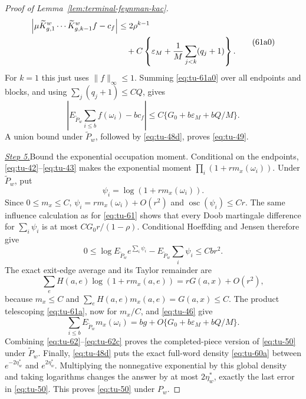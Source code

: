 \begin{proof}[Proof of Lemma~\ref{lem:terminal-feynman-kac}]
\begin{equation}
\begin{split}
\left|\mu\widetilde K_{g,1}^w\cdots
 \widetilde K_{g,k-1}^wf-c_f\right|
 &\le2\rho^{k-1}\\
 &\quad+C\left\{\varepsilon_M+
 {1\over M}\sum_{j<k}(q_j+1)\right\}.                      \end{split}
\tag{61a0}\label{eq:tu-61a0}
\end{equation}
For \(k=1\) this just uses \(\|f\|_\infty\le1\).
Summing \eqref{eq:tu-61a0} over all endpoints and blocks, and using
\(\sum_j(q_j+1)\le C Q\), gives
\begin{equation}
 \left|E_{\widetilde P_w}\sum_{i\le b}f(\omega_i)-bc_f\right|
 \le C\{G_0+b\varepsilon_M+bQ/M\}.                         \tag{61a}\label{eq:tu-61a}
\end{equation}
A union bound under \(\widetilde P_w\), followed by \eqref{eq:tu-48d}, proves
\eqref{eq:tu-49}.

\smallskip\noindent
\underline{\textit{Step 5.}}\quad Bound the exponential occupation moment.
Conditional on the endpoints, \eqref{eq:tu-42}--\eqref{eq:tu-43} makes the exponential moment
\(\prod_i(1+rm_x(\omega_i))\).  Under \(\widetilde P_w\), put
\begin{equation}
                 \psi_i=\log(1+rm_x(\omega_i)).              \tag{62}\label{eq:tu-62}
\end{equation}
Since \(0\le m_x\le C\),
\(\psi_i=rm_x(\omega_i)+O(r^2)\) and
\(\operatorname {osc}(\psi_i)\le Cr\).  The same influence calculation
as for \eqref{eq:tu-61} shows that every Doob martingale difference for
\(\sum_i\psi_i\) is at most \(CG_0r/(1-\rho)\).  Conditional Hoeffding and
Jensen therefore give
\begin{equation}
 0\le\log E_{\widetilde P_w}e^{\sum_i\psi_i}
       -E_{\widetilde P_w}\sum_i\psi_i\le Cbr^2.             \tag{62a}\label{eq:tu-62a}
\end{equation}
The exact exit-edge average and its Taylor remainder are
\begin{equation}
 \sum_eH(a,e)\log(1+rm_x(a,e))=rG(a,x)+O(r^2),             \tag{62b}\label{eq:tu-62b}
\end{equation}
because \(m_x\le C\) and \(\sum_eH(a,e)m_x(a,e)=G(a,x)\le C\).
The product telescoping \eqref{eq:tu-61a}, now for \(m_x/C\), and \eqref{eq:tu-46} give
\begin{equation}
 \sum_{i\le b}E_{\widetilde P_w}m_x(\omega_i)
       =bg+O\{G_0+b\varepsilon_M+bQ/M\}.                    \tag{62c}\label{eq:tu-62c}
\end{equation}
Combining \eqref{eq:tu-62}--\eqref{eq:tu-62c} proves the completed-piece version of \eqref{eq:tu-50} under
\(\widetilde P_w\).  Finally,
\eqref{eq:tu-48d} puts the exact full-word density \eqref{eq:tu-60a} between
\(e^{-2\eta_w^*}\) and \(e^{2\eta_w^*}\).  Multiplying the nonnegative
exponential by this global density and taking logarithms changes the
answer by at most \(2\eta_w^*\), exactly the last error in \eqref{eq:tu-50}.
This proves \eqref{eq:tu-50} under \(P_w\).


\end{proof}
